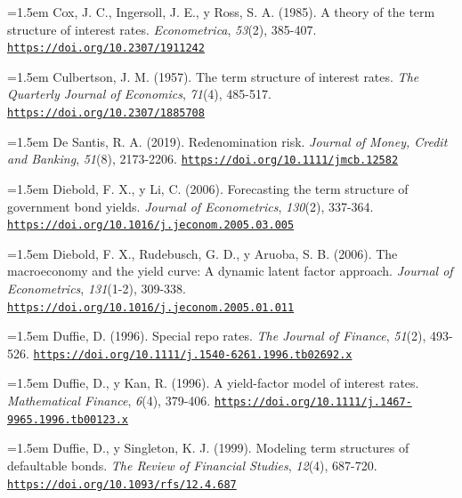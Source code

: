 \documentclass[10pt,a4paper]{article}
\begin{document}
\noindent\hangindent=1.5em Cox, J. C., Ingersoll, J. E., y Ross, S. A. (1985). A theory of the term structure of interest rates. \textit{Econometrica}, \textit{53}(2), 385-407. \href{https://doi.org/10.2307/1911242}{\nolinkurl{https://doi.org/10.2307/1911242}}

\noindent\hangindent=1.5em Culbertson, J. M. (1957). The term structure of interest rates. \textit{The Quarterly Journal of Economics}, \textit{71}(4), 485-517. \href{https://doi.org/10.2307/1885708}{\nolinkurl{https://doi.org/10.2307/1885708}}

\noindent\hangindent=1.5em De Santis, R. A. (2019). Redenomination risk. \textit{Journal of Money, Credit and Banking}, \textit{51}(8), 2173-2206. \href{https://doi.org/10.1111/jmcb.12582}{\nolinkurl{https://doi.org/10.1111/jmcb.12582}}

\noindent\hangindent=1.5em Diebold, F. X., y Li, C. (2006). Forecasting the term structure of government bond yields. \textit{Journal of Econometrics}, \textit{130}(2), 337-364. \href{https://doi.org/10.1016/j.jeconom.2005.03.005}{\nolinkurl{https://doi.org/10.1016/j.jeconom.2005.03.005}}

\noindent\hangindent=1.5em Diebold, F. X., Rudebusch, G. D., y Aruoba, S. B. (2006). The macroeconomy and the yield curve: A dynamic latent factor approach. \textit{Journal of Econometrics}, \textit{131}(1-2), 309-338. \href{https://doi.org/10.1016/j.jeconom.2005.01.011}{\nolinkurl{https://doi.org/10.1016/j.jeconom.2005.01.011}}

{\sloppy\noindent\hangindent=1.5em Duffie, D. (1996). Special repo rates. \textit{The Journal of Finance}, \textit{51}(2), 493-526. \href{https://doi.org/10.1111/j.1540-6261.1996.tb02692.x}{\nolinkurl{https://doi.org/10.1111/j.1540-6261.1996.tb02692.x}}\par}

\noindent\hangindent=1.5em Duffie, D., y Kan, R. (1996). A yield-factor model of interest rates. \textit{Mathematical Finance}, \textit{6}(4), 379-406. \href{https://doi.org/10.1111/j.1467-9965.1996.tb00123.x}{\nolinkurl{https://doi.org/10.1111/j.1467-9965.1996.tb00123.x}}

\noindent\hangindent=1.5em Duffie, D., y Singleton, K. J. (1999). Modeling term structures of defaultable bonds. \textit{The Review of Financial Studies}, \textit{12}(4), 687-720. \href{https://doi.org/10.1093/rfs/12.4.687}{\nolinkurl{https://doi.org/10.1093/rfs/12.4.687}}
\end{document}

